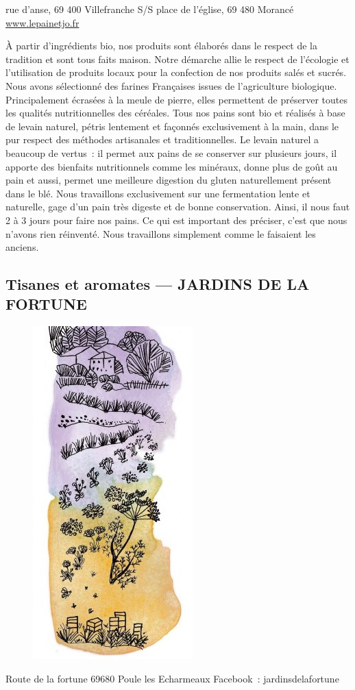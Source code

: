 \documentclass[10pt,a4paper,french]{article}
\makeatletter
\newcommand{\authoredby}[1]{\addtocontents{toc}{\protect\@nameuse{authoredby#1}}}%
\makeatother
\begin{document}
 rue d’anse, 69 400 Villefranche S/S place de l’église, 69 480 Morancé \newline
\href{https://www.lepainetjo.fr}{www.lepainetjo.fr}\newline

\noindent À partir d’ingrédients bio, nos produits sont élaborés dans
le respect de la tradition et sont tous faits maison. Notre démarche
allie le respect de l’écologie et l’utilisation de produits locaux
pour la confection de nos produits salés et sucrés. Nous avons
sélectionné des farines Françaises issues de l’agriculture
biologique. Principalement écrasées à la meule de pierre, elles
permettent de préserver toutes les qualités nutritionnelles des
céréales.  Tous nos pains sont bio et réalisés à base de levain
naturel, pétris lentement et façonnés exclusivement à la main, dans le
pur respect des méthodes artisanales et traditionnelles. Le levain
naturel a beaucoup de vertus\ : il permet aux pains de se conserver sur
plusieurs jours, il apporte des bienfaits nutritionnels comme les
minéraux, donne plus de goût au pain et aussi, permet une meilleure
digestion du gluten naturellement présent dans le blé. Nous
travaillons exclusivement sur une fermentation lente et naturelle,
gage d’un pain très digeste et de bonne conservation. Ainsi, il nous
faut 2 à 3 jours pour faire nos pains. Ce qui est important des
préciser, c’est que nous n’avons rien réinventé. Nous travaillons
simplement comme le faisaient les anciens.

\authoredby{B}
\subsection{Tisanes et aromates --- JARDINS DE LA FORTUNE}\label{subsec:tisanes}

\begin{figure}
\includegraphics[height=0.25\textwidth]{Tisanes1.jpg}
\end{figure}

 Route de la fortune 69680 Poule les  Echarmeaux\newline
Facebook\ : jardinsdelafortune\newline
\end{document}

